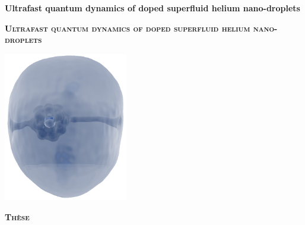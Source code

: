 \begin{titlepage}

\begin{center}

\vspace*{2\bigskipamount}

{\makeatletter
\bfseries\LARGE{Ultrafast quantum dynamics of doped superfluid helium nano-droplets}
\makeatother}

{\makeatletter
\ifx\@subtitle\undefined\else
    \bigskip
    \titlefont\titleshape\Large\@subtitle
\fi
\makeatother}

\end{center}

\cleardoublepage
\thispagestyle{empty}

\begin{center}


\vspace*{2\bigskipamount}

{\makeatletter
\bfseries\Huge\textsc{\textcolor{activeColor}{Ultrafast quantum dynamics of doped superfluid helium nano-droplets}}
\makeatother}

{\makeatletter
\ifx\@subtitle\undefined\else
    \bigskip
    \titlefont\titleshape\Large\@subtitle
\fi
\makeatother}

\vfill
\includegraphics[height=6.5cm]{title}
\vfill


{\Large\bfseries\textsc{\textcolor{activeColor}{Th\`{e}se}}}


\end{center}
\end{titlepage}
